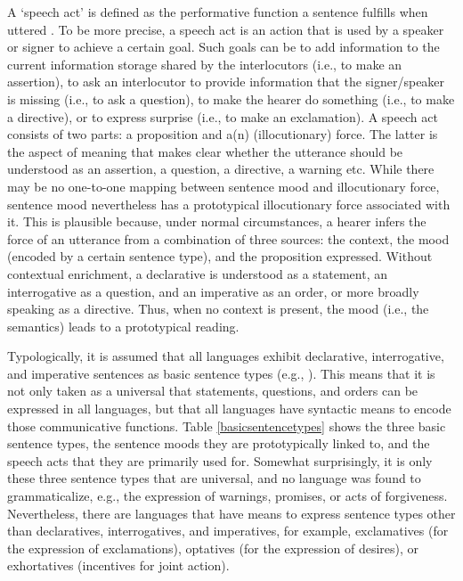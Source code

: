 \noindent A `speech act' is defined as the performative function a sentence fulfills when uttered \citep{austin1962things}. To be more precise, a speech act is an action that is used by a speaker or signer to achieve a certain goal. Such goals can be to add information to the current information storage shared by the interlocutors (i.e., to make an assertion), to ask an interlocutor to provide information that the signer/speaker is missing (i.e., to ask a question), to make the hearer do something (i.e., to make a directive), or to express surprise (i.e., to make an exclamation). A speech act consists of two parts: a proposition and a(n) (illocutionary) force. The latter is the aspect of meaning that makes clear whether the utterance should be understood as an assertion, a question, a directive, a warning etc. While there may be no one-to-one mapping between sentence mood and illocutionary force, sentence mood nevertheless has a prototypical illocutionary force associated with it. This is plausible because, under normal circumstances, a hearer infers the force of an utterance from a combination of three sources:\label{threesources} the context, the mood (encoded by a certain sentence type), and the proposition expressed. Without contextual enrichment, a declarative is understood as a statement, an interrogative as a question, and an imperative as an order, or more broadly speaking as a directive. Thus, when no context is present, the mood (i.e., the semantics) leads to a prototypical reading.


Typologically, it is assumed that all languages exhibit declarative, interrogative, and imperative sentences as basic sentence types (e.g., \citealt{lyons1977semantics, sadock1985speech}). This means that it is not only taken as a universal that statements, questions, and orders can be expressed in all languages, but that all languages have syntactic means to encode those communicative functions. Table \ref{basicsentencetypes} shows the three basic sentence types, the sentence moods they are prototypically linked to, and the speech acts that they are primarily used for. Somewhat surprisingly, it is only these three sentence types that are universal, and no language was found to grammaticalize, e.g., the expression of warnings, promises, or acts of forgiveness. Nevertheless, there are languages that have means to express sentence types other than declaratives, interrogatives, and imperatives, for example, exclamatives (for the expression of exclamations), optatives (for the expression of desires), or exhortatives (incentives for joint action).

